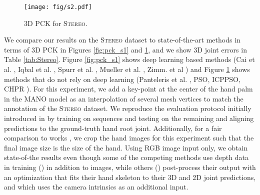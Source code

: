 \documentclass[10pt,twocolumn,letterpaper]{article}
\begin{document}
\begin{figure}[h!]
\center
\texttt{[image: fig/s2.pdf]}
\vspace{-8pt}
\caption{3D PCK for \textsc{Stereo}.}
\label{fig:pck_s2}
\end{figure}

\vspace{-5pt}
\begin{table}[h!]
\center
{}
\vspace{-5pt}
\caption{Average 3D joint distance (mm) to ground-truth for \textsc{Stereo}.}
\label{tab:Stereo}
\end{table}

We compare our results on the \textsc{Stereo} dataset to state-of-the-art methods in terms of 3D PCK in Figures \ref{fig:pck_s1} and \ref{fig:pck_s2}, and we show 3D joint errors in Table \ref{tab:Stereo}. Figure \ref{fig:pck_s1} shows deep learning based methods (Cai et al. \cite{cai2018weakly}, Iqbal et al. \cite{iqbal2018hand}, Spurr et al. \cite{spurr2018cross}, Mueller et al. \cite{GANeratedHands_CVPR2018}, Zimm. et al \cite{zimmermann2017learning}) and Figure \ref{fig:pck_s2} shows methods that do not rely on deep learning (Panteleris et al. \cite{panteleris2018using}, PSO, ICPPSO, CHPR \cite{zhang20163d} ). For this experiment, we add a key-point at the center of the hand palm in the MANO model \cite{romero2017embodied} as an interpolation of several mesh vertices to match the annotation of the \textsc{Stereo} dataset. We reproduce the evaluation protocol initially introduced in \cite{zimmermann2017learning} by training on  sequences and testing on the remaining  and aligning predictions to the ground-truth hand root joint. Additionally, for a fair comparison to works \cite{cai2018weakly,spurr2018cross,iqbal2018hand}, we crop the hand images for this experiment such that the final image size is  the size of the hand. Using RGB image input only, we obtain state-of-the results even though some of the competing methods use depth data in training (\cite{cai2018weakly,iqbal2018hand}) in addition to images, while others (\cite{GANeratedHands_CVPR2018}) post-process their output with an optimization that fits their hand skeleton to their 3D and 2D joint predictions, and which uses the camera intrinsics as an additional input. 
 
\end{document}
